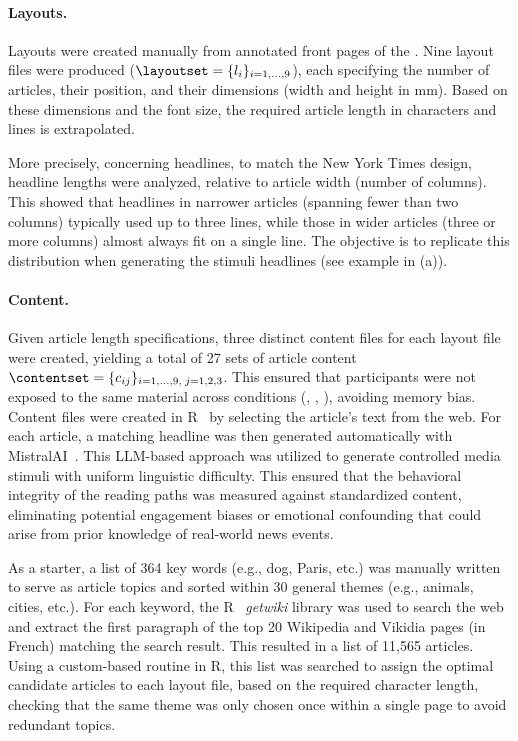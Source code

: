 \paragraph{Layouts.}  
Layouts were created manually from annotated front pages of the \NYT. Nine layout files were produced ($\layoutset=\{l_i\}_{i=1,\dots,9}$), each specifying the number of articles, their position, and their dimensions (width and height in mm). Based on these dimensions and the font size,  the required article length in characters and lines is extrapolated. 

More precisely, concerning headlines, to match the New York Times design, headline lengths were analyzed, relative to article width (number of columns). This showed that headlines in narrower articles (spanning fewer than two columns) typically used up to three lines, while those in wider articles (three or more columns) almost always fit on a single line. The objective is to replicate this distribution when generating the stimuli headlines (see example in (a)). 

\paragraph{Content.}  
Given article length specifications, three distinct content files for each layout file were created, yielding a total of 27 sets of article content $\contentset=\{c_{ij}\}_{i=1,\dots,9,\; j=1,2,3}$. This ensured that participants were not exposed to the same material across conditions (\condzeronot, \condonenot, \condtwonot), avoiding memory bias. Content files were created in R~\cite{R} by selecting the article's text from the web. For each article, a matching headline was then generated automatically with MistralAI~\cite{mistralai}. This LLM-based approach was utilized to generate controlled media stimuli with uniform linguistic difficulty. This ensured that the behavioral integrity of the reading paths was measured against standardized content, eliminating potential engagement biases or emotional confounding that could arise from prior knowledge of real-world news events.

As a starter, a list of 364 key words (e.g., dog, Paris, etc.) was manually written to serve as article topics and sorted within 30 general themes (e.g., animals, cities, etc.). For each keyword, the R~\cite{R} \emph{getwiki} library was used to search the web and extract the first paragraph of the top 20 Wikipedia and Vikidia pages (in French) matching the search result. This resulted in a list of 11,565 articles. Using a custom-based routine in R, this list was searched to assign the optimal candidate articles to each layout file, based on the required character length, checking that the same theme was only chosen once within a single page to avoid redundant topics. 

